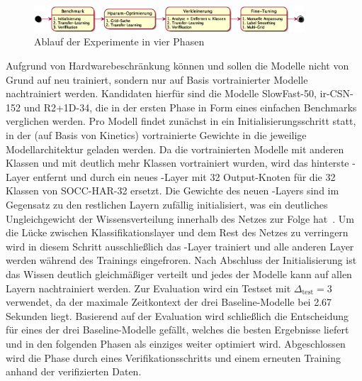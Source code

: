 \begin{figure}[htbp!]
    \centering
    \includegraphics[width=0.9\textwidth, height=0.8\textwidth, keepaspectratio, interpolate]{fig/phases.eps}
    \caption{Ablauf der Experimente in vier Phasen}
    \label{fig:phases}
\end{figure}

Aufgrund von Hardwarebeschränkung können und sollen die Modelle nicht von Grund auf neu trainiert, sondern nur auf Basis vortrainierter Modelle nachtrainiert werden.
Kandidaten hierfür sind die Modelle SlowFast-50, ir-CSN-152 und R2+1D-34, die in der ersten Phase in Form eines einfachen Benchmarks verglichen werden.
Pro Modell findet zunächst in ein Initialisierungsschritt statt, in der (auf Basis von Kinetics) vortrainierte Gewichte in die jeweilige Modellarchitektur geladen werden.
Da die vortrainierten Modelle mit anderen Klassen und mit deutlich mehr Klassen vortrainiert wurden, wird das hinterste \fc-Layer entfernt und durch ein neues \fc-Layer mit 32 Output-Knoten für die 32 Klassen von SOCC-HAR-32 ersetzt.
Die Gewichte des neuen \fc-Layers sind im Gegensatz zu den restlichen Layern zufällig initialisiert, was ein deutliches Ungleichgewicht der Wissensverteilung innerhalb des Netzes zur Folge hat~\cite{Gugger20}.
Um die Lücke zwischen Klassifikationslayer und dem Rest des Netzes zu verringern wird in diesem Schritt ausschließlich das \fc-Layer trainiert und alle anderen Layer werden während des Trainings eingefroren.
Nach Abschluss der Initialisierung ist das Wissen deutlich gleichmäßiger verteilt und jedes der Modelle kann auf allen Layern nachtrainiert werden.
Zur Evaluation wird ein Testset mit $\Delta_\text{test}=3$ verwendet, da der maximale Zeitkontext der drei Baseline-Modelle bei 2.67 Sekunden liegt.
Basierend auf der Evaluation wird schließlich die Entscheidung für eines der drei Baseline-Modelle gefällt, welches die besten Ergebnisse liefert und in den folgenden Phasen als einziges weiter optimiert wird.
Abgeschlossen wird die Phase durch eines Verifikationsschritts und einem erneuten Training anhand der verifizierten Daten.

